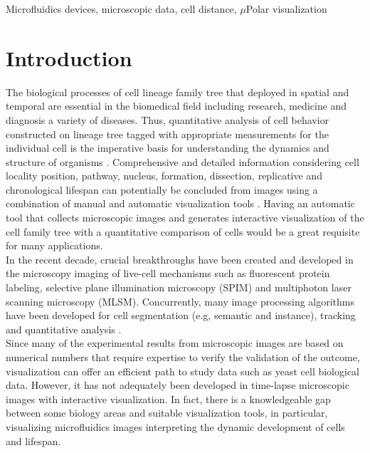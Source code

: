 \documentclass[conference]{IEEEtran}
\begin{document}
\begin{IEEEkeywords}
Microfluidics devices, microscopic data, cell distance, $\mu$Polar visualization 
\end{IEEEkeywords}

\section{Introduction}
 
The biological processes of cell lineage family tree that deployed in spatial and temporal are essential in the biomedical field including research, medicine and diagnosis a variety of diseases. Thus, quantitative analysis of cell behavior constructed on lineage tree tagged with appropriate measurements for the individual cell is the imperative basis for understanding the dynamics and structure of organisms \cite{r2.6}. Comprehensive and detailed information considering cell locality position, pathway, nucleus, formation, dissection, replicative and chronological lifespan can potentially be concluded from images using a combination of manual and automatic visualization tools \cite{r2.7}. Having an automatic tool that collects microscopic images and generates interactive visualization of the cell family tree with a quantitative comparison of cells would be a great requisite for many applications.\\

In the recent decade, crucial breakthroughs have been created and developed in the microscopy imaging of live-cell mechanisms such as fluorescent protein labeling, selective plane illumination microscopy (SPIM) and multiphoton laser scanning microscopy (MLSM)\cite{r2.7,r2.8}. Concurrently, many image processing algorithms have been developed for cell segmentation (e.g, semantic and instance), tracking and quantitative analysis \cite{r2.10}.\\

Since many of the experimental results from microscopic images are based on numerical numbers that require expertise to verify the validation of the outcome, visualization can offer an efficient path to study data such as yeast cell biological data. However, it has not adequately been developed in time-lapse microscopic images with interactive visualization. In fact, there is a knowledgeable gap between some biology areas and suitable visualization tools, in particular, visualizing microfluidics images interpreting the dynamic development of cells and lifespan. 
\end{document}

